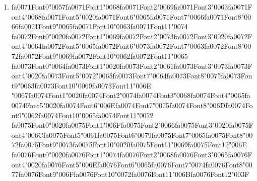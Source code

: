 \documentclass[12pt]{article}
\begin{document}
\begin{enumerate}[label=Q\arabic*.]
 \item {\csname fa0071Font0\endcsname\char"0057}{\csname fa0071Font1\endcsname\char"0068}{\csname fa0071Font2\endcsname\char"0069}{\csname fa0071Font3\endcsname\char"0063}{\csname fa0071Font4\endcsname\char"0068}{\csname fa0071Font5\endcsname\char"0020}{\csname fa0071Font6\endcsname\char"0065}{\csname fa0071Font7\endcsname\char"0066}{\csname fa0071Font8\endcsname\char"0066}{\csname fa0071Font9\endcsname\char"0065}{\csname fa0071Font10\endcsname\char"0063}{\csname fa0071Font11\endcsname\char"0074} {\csname fa0072Font0\endcsname\char"0020}{\csname fa0072Font1\endcsname\char"0069}{\csname fa0072Font2\endcsname\char"0073}{\csname fa0072Font3\endcsname\char"0020}{\csname fa0072Font4\endcsname\char"0064}{\csname fa0072Font5\endcsname\char"0065}{\csname fa0072Font6\endcsname\char"0073}{\csname fa0072Font7\endcsname\char"0063}{\csname fa0072Font8\endcsname\char"0072}{\csname fa0072Font9\endcsname\char"0069}{\csname fa0072Font10\endcsname\char"0062}{\csname fa0072Font11\endcsname\char"0065} {\csname fa0073Font0\endcsname\char"0064}{\csname fa0073Font1\endcsname\char"0020}{\csname fa0073Font2\endcsname\char"0061}{\csname fa0073Font3\endcsname\char"0073}{\csname fa0073Font4\endcsname\char"0020}{\csname fa0073Font5\endcsname\char"0072}{\char"0065}{\csname fa0073Font7\endcsname\char"0064}{\csname fa0073Font8\endcsname\char"0075}{\csname fa0073Font9\endcsname\char"0063}{\csname fa0073Font10\endcsname\char"0069}{\csname fa0073Font11\endcsname\char"006E} {\char"0067}{\csname fa0074Font1\endcsname\char"0020}{\csname fa0074Font2\endcsname\char"0074}{\csname fa0074Font3\endcsname\char"0068}{\csname fa0074Font4\endcsname\char"0065}{\csname fa0074Font5\endcsname\char"0020}{\csname fa0074Font6\endcsname\char"006E}{\csname fa0074Font7\endcsname\char"0075}{\csname fa0074Font8\endcsname\char"006D}{\csname fa0074Font9\endcsname\char"0062}{\csname fa0074Font10\endcsname\char"0065}{\csname fa0074Font11\endcsname\char"0072} {\csname fa0075Font0\endcsname\char"0020}{\csname fa0075Font1\endcsname\char"006F}{\csname fa0075Font2\endcsname\char"0066}{\csname fa0075Font3\endcsname\char"0020}{\csname fa0075Font4\endcsname\char"006C}{\csname fa0075Font5\endcsname\char"0061}{\csname fa0075Font6\endcsname\char"0079}{\csname fa0075Font7\endcsname\char"0065}{\csname fa0075Font8\endcsname\char"0072}{\csname fa0075Font9\endcsname\char"0073}{\csname fa0075Font10\endcsname\char"0020}{\csname fa0075Font11\endcsname\char"0069}{\csname fa0075Font12\endcsname\char"006E} {\csname fa0076Font0\endcsname\char"0020}{\csname fa0076Font1\endcsname\char"0074}{\csname fa0076Font2\endcsname\char"0068}{\csname fa0076Font3\endcsname\char"0065}{\csname fa0076Font4\endcsname\char"0020}{\csname fa0076Font5\endcsname\char"006E}{\csname fa0076Font6\endcsname\char"0065}{\csname fa0076Font7\endcsname\char"0074}{\csname fa0076Font8\endcsname\char"0077}{\csname fa0076Font9\endcsname\char"006F}{\csname fa0076Font10\endcsname\char"0072}{\csname fa0076Font11\endcsname\char"006B}{\csname fa0076Font12\endcsname\char"003F}

\end{enumerate}
\end{document}
